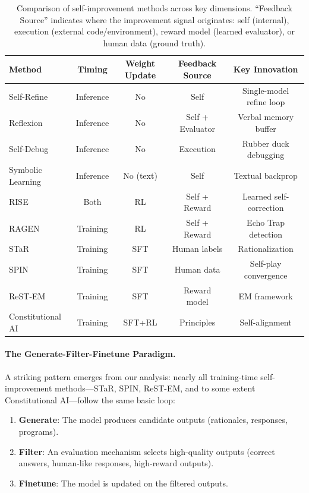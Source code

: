 \begin{table}[t]
\centering
\caption{Comparison of self-improvement methods across key dimensions. ``Feedback Source'' indicates where the improvement signal originates: self (internal), execution (external code/environment), reward model (learned evaluator), or human data (ground truth).}
\label{tab:self-improvement-comparison}
\small
\begin{tabular}{@{}lcccc@{}}
\toprule
\textbf{Method} & \textbf{Timing} & \textbf{Weight Update} & \textbf{Feedback Source} & \textbf{Key Innovation} \\
\midrule
Self-Refine & Inference & No & Self & Single-model refine loop \\
Reflexion & Inference & No & Self + Evaluator & Verbal memory buffer \\
Self-Debug & Inference & No & Execution & Rubber duck debugging \\
Symbolic Learning & Inference & No (text) & Self & Textual backprop \\
RISE & Both & RL & Self + Reward & Learned self-correction \\
RAGEN & Training & RL & Self + Reward & Echo Trap detection \\
\midrule
STaR & Training & SFT & Human labels & Rationalization \\
SPIN & Training & SFT & Human data & Self-play convergence \\
ReST-EM & Training & SFT & Reward model & EM framework \\
Constitutional AI & Training & SFT+RL & Principles & Self-alignment \\
\bottomrule
\end{tabular}
\end{table}

\paragraph{The Generate-Filter-Finetune Paradigm.}
A striking pattern emerges from our analysis: nearly all training-time self-improvement methods---STaR, SPIN, ReST-EM, and to some extent Constitutional AI---follow the same basic loop:

\begin{enumerate}
    \item \textbf{Generate}: The model produces candidate outputs (rationales, responses, programs).
    \item \textbf{Filter}: An evaluation mechanism selects high-quality outputs (correct answers, human-like responses, high-reward outputs).
    \item \textbf{Finetune}: The model is updated on the filtered outputs.
\end{enumerate}


